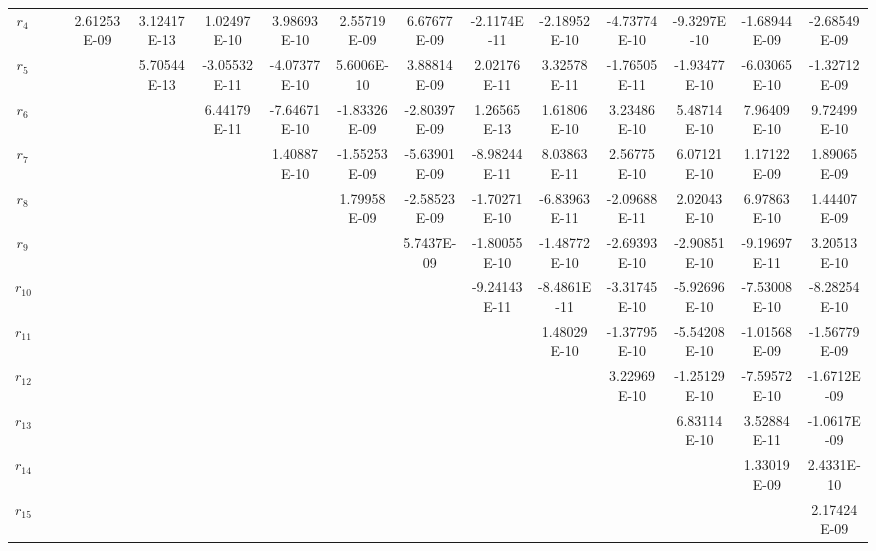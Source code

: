 \documentclass[a4paper]{article}
\begin{document}
\begin{CJK*}{GBK}{song}
\begin{center}
\begin{table*}[!htbp]
{\begin{threeparttable}[!htpb]
\begin{tabular}{ccccc ccccc ccccc}
$r _{4}$	&		&		&	2.61253E-09	&	3.12417E-13	&	1.02497E-10	&	3.98693E-10	&	2.55719E-09	&	6.67677E-09	&	-2.1174E-11	&	-2.18952E-10	&	-4.73774E-10	&	-9.3297E-10	&	-1.68944E-09	&	-2.68549E-09	\\
$r _{5}$	&		&		&		&	5.70544E-13	&	-3.05532E-11	&	-4.07377E-10	&	5.6006E-10	&	3.88814E-09	&	2.02176E-11	&	3.32578E-11	&	-1.76505E-11	&	-1.93477E-10	&	-6.03065E-10	&	-1.32712E-09	\\
$r _{6}$	&		&		&		&		&	6.44179E-11	&	-7.64671E-10	&	-1.83326E-09	&	-2.80397E-09	&	1.26565E-13	&	1.61806E-10	&	3.23486E-10	&	5.48714E-10	&	7.96409E-10	&	9.72499E-10	\\
$r _{7}$	&		&		&		&		&		&	1.40887E-10	&	-1.55253E-09	&	-5.63901E-09	&	-8.98244E-11	&	8.03863E-11	&	2.56775E-10	&	6.07121E-10	&	1.17122E-09	&	1.89065E-09	\\
$r _{8}$	&		&		&		&		&		&		&	1.79958E-09	&	-2.58523E-09	&	-1.70271E-10	&	-6.83963E-11	&	-2.09688E-11	&	2.02043E-10	&	6.97863E-10	&	1.44407E-09	\\
$r _{9}$	&		&		&		&		&		&		&		&	5.7437E-09	&	-1.80055E-10	&	-1.48772E-10	&	-2.69393E-10	&	-2.90851E-10	&	-9.19697E-11	&	3.20513E-10	\\
$r _{10}$	&		&		&		&		&		&		&		&		&	-9.24143E-11	&	-8.4861E-11	&	-3.31745E-10	&	-5.92696E-10	&	-7.53008E-10	&	-8.28254E-10	\\
$r _{11}$	&		&		&		&		&		&		&		&		&		&	1.48029E-10	&	-1.37795E-10	&	-5.54208E-10	&	-1.01568E-09	&	-1.56779E-09	\\
$r _{12}$	&		&		&		&		&		&		&		&		&		&		&	3.22969E-10	&	-1.25129E-10	&	-7.59572E-10	&	-1.6712E-09	\\
$r _{13}$	&		&		&		&		&		&		&		&		&		&		&		&	6.83114E-10	&	3.52884E-11	&	-1.0617E-09	\\
$r _{14}$	&		&		&		&		&		&		&		&		&		&		&		&		&	1.33019E-09	&	2.4331E-10	\\
$r _{15}$	&		&		&		&		&		&		&		&		&		&		&		&		&		&	2.17424E-09	\\
\bottomrule
\end{tabular}
\end{threeparttable}}%
\end{table*}
\end{center}



\end{CJK*}
\end{document}
